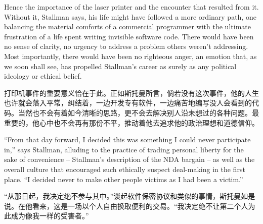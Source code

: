 \ifdefined\eng
Hence the importance of the laser printer and the encounter that resulted from it. Without it, Stallman says, his life might have followed a more ordinary path, one balancing the material comforts of a commercial programmer with the ultimate frustration of a life spent writing invisible software code. There would have been no sense of clarity, no urgency to address a problem others weren't addressing. Most importantly, there would have been no righteous anger, an emotion that, as we soon shall see, has propelled Stallman's career as surely as any political ideology or ethical belief.
\fi

\ifdefined\chs
打印机事件的重要意义恰在于此。正如斯托曼所言，倘若没有这次事件，他的人生也许就会落入平常，纠结着，一边开发专有软件，一边痛苦地编写没人会看到的代码。当然也不会有着如今清晰的思路，更不会去解决别人沿未想过的各种问题。最重要的，他心中也不会再有那份不平，推动着他去追求他的政治理想和道德信仰。
\fi

\ifdefined\eng
``From that day forward, I decided this was something I could never participate in,'' says Stallman, alluding to the practice of trading personal liberty for the sake of convenience -- Stallman's description of the NDA bargain -- as well as the overall culture that encouraged such ethically suspect deal-making in the first place. ``I decided never to make other people victims as I had been a victim.''
\fi

\ifdefined\chs
“从那日起，我决定绝不参与其中。”谈起软件保密协议和类似的事情，斯托曼如是说。在他看来，这是一场以个人自由换取便利的交易。“我决定绝不让第二个人为此成为像我一样的受害者。”
\fi

\theendnotes
\setcounter{endnote}{0}
